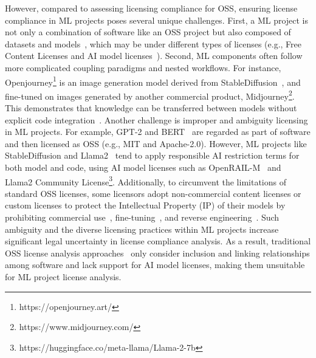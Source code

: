 However, compared to assessing licensing compliance for OSS, ensuring license compliance in ML projects poses several unique challenges. 
First, a ML project is not only a combination of software like an OSS project but also composed of datasets and models~\cite{han2021pre}, which may be under different types of licenses (e.g., Free Content Licenses and AI model licenses~\cite{contractor2022behavioral}).
Second, ML components often follow more complicated coupling paradigms and nested workflows. For instance, Openjourney\footnote{https://openjourney.art/} is an image generation model derived from StableDiffusion~\cite{rombach2022high}, and fine-tuned on images generated by another commercial product, Midjourney\footnote{https://www.midjourney.com/}.
This demonstrates that knowledge can be transferred between models without explicit code integration~\cite{you2021workshop}.
Another challenge is improper and ambiguity licensing in ML projects.
For example, GPT-2 and BERT~\cite{devlin2019bert} are regarded as part of software and then licensed as OSS (e.g., MIT and Apache-2.0).
However, ML projects like StableDiffusion and Llama2~\cite{touvron2023llama} tend to apply responsible AI restriction terms for both model and code, using AI model licenses such as OpenRAIL-M~\cite{contractor2022behavioral} and Llama2 Community License\footnote{https://huggingface.co/meta-llama/Llama-2-7b}.
Additionally, to circumvent the limitations of standard OSS licenses, some licensors adopt non-commercial content licenses or custom licenses to protect the Intellectual Property (IP) of their models by prohibiting commercial use~\cite{huang2022layoutlmv3}, fine-tuning~\cite{dreamlike2023}, and reverse engineering~\cite{goyal2022vision}.
Such ambiguity and the diverse licensing practices within ML projects  increase significant legal uncertainty in license compliance analysis.
As a result, traditional OSS license analysis approaches~\cite{ombredanne2020free, mathur2012empirical} only consider inclusion and linking relationships among software and lack support for AI model licenses, making them unsuitable for ML project license analysis.

